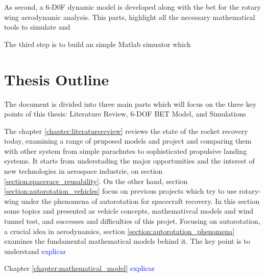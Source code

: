 As second, a 6-D0F dynamic model is developed along with the \gls{bet} for the rotary wing aerodynamic analysis. This parts, highlight all the necessary mathematical tools to simulate and 

The third step is to build an simple Matlab simuator which 


\section{Thesis Outline}
\label{section:outline}

The document is divided into three main parts which will focus on the three key points of this thesis: Literature Review, 6-DOF BET Model, and Simulations

The chapter \ref{chapter:literaturereview} reviews the state of the rocket recovery today, examining a range of pruposed models and project and comparing them with other system from simple parachutes to sophisticated propulsive landing systems. It starts from understading the major opportunities and the interest of new technologies in aerospace industrie, on section \ref{section:spacerace_reusability}. On the other hand, section \ref{section:autorotation_vehicles} focus on previous projects which try to use rotary-wing under the phenomena of autorotation for spacecraft recovery. In this section some topics and presented as vehicle concepts, mathemativcal models and wind tunnel test, and successes and difficulties of this projet. Focusing on autorotation, a crucial idea in aerodynamics, section \ref{section:autorotation_phenomena} examines the fundamental mathematical models behind it. The key point is to understand \textcolor{blue}{explicar}


Chapter \ref{chapter:mathematical_model} \textcolor{blue}{explicar}